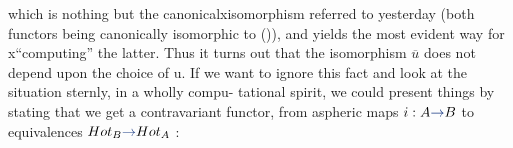 \documentclass[10pt,oneside]{book}
\newcounter{pslinkmark}
\newif\ifPSInLink
\newcommand{\CurrentScanURL}{}
\newcommand{\CurrentKey}{}
\newcommand{\pslinkmarker}[2]{\stepcounter{pslinkmark}\latelua{texio.write_nl('log','PS-LINK-SHIP|#1|\CurrentKey|\arabic{pslinkmark}|#2')}}
\newcommand{\pslink}[2]{\ifPSInLink\pslinkmarker{#1}{nested}#2\else\begingroup\PSInLinktrue\href{\CurrentScanURL}{\pslinkmarker{#1}{outer}#2}\endgroup\fi}
\newcommand{\hand}[1]{{\ifnum\EditionMode=2\color{black}\else\color{PSHand}\fi #1}}
\let\over\relax
\newcommand{\xout}[1]{{\color{PSTypedOld}\ifmmode\text{[x: }#1\text{]}\else[\textsf{x:} #1]\fi}}
\newcommand{\unsure}[1]{\pslink{unsure}{[#1\ifmmode\,?\else\,?\fi]}}
\begin{document}
which is nothing but the canonical\xout{x}isomorphism referred to yesterday
\margin{(*)} (both functors being canonically isomorphic to (\over{**}{\unsure{1'}})), and yields the
most evident way for \xout{x}\allowbreak{}``computing'' the latter. Thus it turns out that
the isomorphism $\overline{u}$ does not depend upon the choice of u. If we want
to ignore this fact and look at the situation sternly, in a wholly compu-%
tational spirit, we could present things by stating that we get a
contravariant functor, from aspheric maps $i: A \hand{\to} B$ to equivalences
$Hot_B \hand{\to} Hot_A$ :
\end{document}
